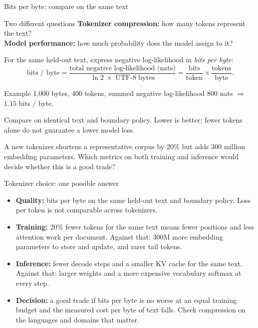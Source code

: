 \documentclass[handout]{beamer}
\begin{document}
\begin{frame}{Bits per byte: compare on the same text}
  \small
  \begin{block}{Two different questions}
    \textbf{Tokenizer compression:} how many tokens represent the text?\\[3pt]
    \textbf{Model performance:} how much probability does the model assign to it?
  \end{block}
  For the same held-out text, express negative log-likelihood in \emph{bits per byte}:
  \[
    \text{bits / byte} =
    \frac{\text{total negative log-likelihood (nats)}}{\ln 2\;\times\;\text{UTF-8 bytes}}
    = \frac{\text{bits}}{\text{token}}\times\frac{\text{tokens}}{\text{byte}}.
  \]
  \begin{exampleblock}{Example}
    1,000 bytes, 400 tokens, summed negative log-likelihood 800 nats $\Rightarrow$ $1.15$ bits / byte.
  \end{exampleblock}
  Compare on identical text and boundary policy. Lower is better; fewer tokens alone do not guarantee a lower model loss.
\end{frame}

{A new tokenizer shortens a representative corpus by 20\% but adds 300 million embedding parameters.
Which metrics on both training and inference would decide whether this is a good trade?}

\begin{frame}{Tokenizer choice: one possible answer}
  \small
  \begin{itemize}
      \setlength{\itemsep}{8pt}
    \item \textbf{Quality:} bits per byte on the same held-out text and boundary policy. Loss per token is not comparable across tokenizers.
    \item \textbf{Training:} 20\% fewer tokens for the same text means fewer positions and less attention work per document. Against that: 300M more embedding parameters to store and update, and rarer tail tokens.
    \item \textbf{Inference:} fewer decode steps and a smaller KV cache for the same text. Against that: larger weights and a more expensive vocabulary softmax at every step.
    \item \textbf{Decision:} a good trade if bits per byte is no worse at an equal training budget and the measured cost per byte of text falls. Check compression on the languages and domains that matter.
  \end{itemize}
\end{frame}
\end{document}
